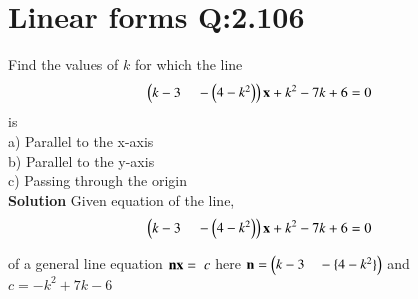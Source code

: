 \documentclass[journal,12pt,twocolumn]{IEEEtran}
\begin{document}
\section{Linear forms Q:2.106} \text Find the values of $k$ for which the line
\begin{align}
\myvec{k-3 \hspace{4mm}-\myvec{4-k^2}}\vec{x}+k^2-7k+6=0
\end{align}
is\\
a) Parallel to the x-axis\\
b) Parallel to the y-axis\\
c) Passing through the origin\\
%
\vskip 0.5cm
\textbf{Solution} Given equation of the line, 
\begin{align}
\myvec{k-3 \hspace{4mm}-\myvec{4-k^2}}\vec{x}+k^2-7k+6=0\label{eq:1}
\end{align}
\begin{center}
 \begin{sloppypar}of a general line equation\hspace{4mm} ${\vec{nx = }\hspace{2mm}c}$\newline
here ${\vec{n}=\myvec{k-3 \hspace{3.5mm}-\{4-k^2\}}}$\newline
and\hspace{4mm} ${c = -k^2+7k-6}$\end{sloppypar}\end{center}
\end{document}
